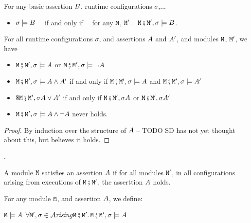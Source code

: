 \begin{lemma}
For any basic assertion $\SA$, runtime configurations $\sigma$,...
\begin{itemize}
\item $\sigma \models \SA$ \ \ if and only if \ \  for any $\M$, $\M'$. \, $\M\mkpair \M', \sigma \models\SA$.
\end{itemize}
\end{lemma}
 
\begin{lemma}
For all runtime configurations $\sigma$, and   assertions $\A$ and $\A'$, and modules
$\M$, $\M'$,
we have
\label{lemma:basic_assertions_classical}
\begin{itemize}
\item
$\M\mkpair \M', \sigma \models \A$ or  $\M\mkpair \M', \sigma \models \neg\A$
\item
$\M\mkpair \M', \sigma \models \A \wedge \A'$ \SP if and only if \SP  $\M\mkpair \M', \sigma \models \A$ and  $\M\mkpair \M', \sigma \models \A'$ 
\item
$\$\M\mkpair \M', \sigma \A \vee \A'$ \SP if and only if \SP $\M\mkpair \M', \sigma \A$ or  $\M\mkpair \M', \sigma \A'$ 
\item
$\M\mkpair \M', \sigma\models \A \wedge \neg\A$ never holds.
\end{itemize}
\end{lemma}
\begin{proof} By induction over the structure of $\A$ -- TODO  SD has not yet thought about this, but believes it holds. \end{proof}.

A module $\M$ satisfies an assertion $\A$ if for all modules $\M'$, in all configurations arising from executions of $\M\mkpair\M'$, the asserttion $\A$ holds.

\begin{definition}
\label{def:module_satisfies}
For any module $\M$, and  assertion $\A$, we define:

$\M \models \A$ \IFF  $\forall \M',\sigma\in \Arising{\M\mkpair\M'}. \, \M\mkpair\M', \sigma \models \A$
\end{definition}

